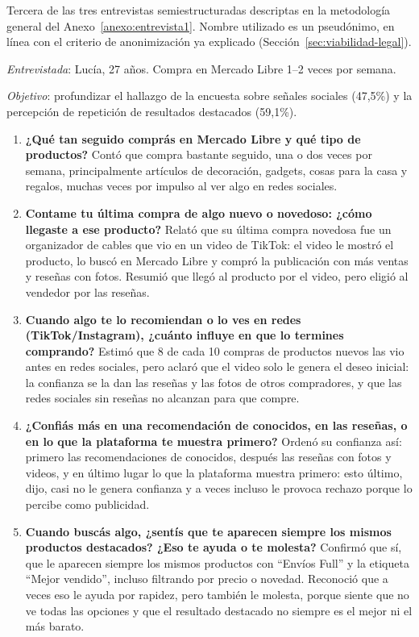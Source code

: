 \label{anexo:entrevista3}

Tercera de las tres entrevistas semiestructuradas descriptas en la metodología general del Anexo~\ref{anexo:entrevista1}. Nombre utilizado es un pseudónimo, en línea con el criterio de anonimización ya explicado (Sección~\ref{sec:viabilidad-legal}).

\emph{Entrevistada}: Lucía, 27 años. Compra en Mercado Libre 1--2 veces por semana.

\emph{Objetivo}: profundizar el hallazgo de la encuesta sobre señales sociales (47,5\%) y la percepción de repetición de resultados destacados (59,1\%).

\begin{enumerate}
	\item \textbf{¿Qué tan seguido comprás en Mercado Libre y qué tipo de productos?} Contó que compra bastante seguido, una o dos veces por semana, principalmente artículos de decoración, gadgets, cosas para la casa y regalos, muchas veces por impulso al ver algo en redes sociales.
	\item \textbf{Contame tu última compra de algo nuevo o novedoso: ¿cómo llegaste a ese producto?} Relató que su última compra novedosa fue un organizador de cables que vio en un video de TikTok: el video le mostró el producto, lo buscó en Mercado Libre y compró la publicación con más ventas y reseñas con fotos. Resumió que llegó al producto por el video, pero eligió al vendedor por las reseñas.
	\item \textbf{Cuando algo te lo recomiendan o lo ves en redes (TikTok/Instagram), ¿cuánto influye en que lo termines comprando?} Estimó que 8 de cada 10 compras de productos nuevos las vio antes en redes sociales, pero aclaró que el video solo le genera el deseo inicial: la confianza se la dan las reseñas y las fotos de otros compradores, y que las redes sociales sin reseñas no alcanzan para que compre.
	\item \textbf{¿Confiás más en una recomendación de conocidos, en las reseñas, o en lo que la plataforma te muestra primero?} Ordenó su confianza así: primero las recomendaciones de conocidos, después las reseñas con fotos y videos, y en último lugar lo que la plataforma muestra primero: esto último, dijo, casi no le genera confianza y a veces incluso le provoca rechazo porque lo percibe como publicidad.
	\item \textbf{Cuando buscás algo, ¿sentís que te aparecen siempre los mismos productos destacados? ¿Eso te ayuda o te molesta?} Confirmó que sí, que le aparecen siempre los mismos productos con ``Envíos Full'' y la etiqueta ``Mejor vendido'', incluso filtrando por precio o novedad. Reconoció que a veces eso le ayuda por rapidez, pero también le molesta, porque siente que no ve todas las opciones y que el resultado destacado no siempre es el mejor ni el más barato.

\end{enumerate}
